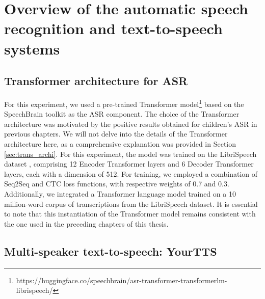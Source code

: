 \section{Overview of the automatic speech recognition and text-to-speech systems}
\label{section:SOA}
\subsection{Transformer architecture for ASR}

For this experiment, we used a pre-trained Transformer model\footnote{https://huggingface.co/speechbrain/asr-transformer-transformerlm-librispeech/} based on the SpeechBrain toolkit \cite{speechbrain} as the \ac{ASR} component. The choice of the Transformer architecture was motivated by the positive results obtained for children's \ac{ASR} in previous chapters. We will not delve into the details of the Transformer architecture here, as a comprehensive explanation was provided in Section \ref{sec:trans_archi}. For this experiment, the model was trained on the LibriSpeech dataset \cite{librispeech}, comprising 12 Encoder Transformer layers and 6 Decoder Transformer layers, each with a dimension of 512. For training, we employed a combination of \ac{Seq2Seq} and \ac{CTC} loss functions, with respective weights of 0.7 and 0.3. Additionally, we integrated a Transformer language model trained on a 10 million-word corpus of transcriptions from the LibriSpeech dataset.
It is essential to note that this instantiation of the Transformer model remains consistent with the one used in the preceding chapters of this thesis.


\subsection{Multi-speaker text-to-speech: YourTTS}

